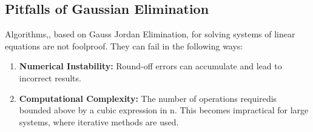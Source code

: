 \documentclass[a4paper, 10pt]{article}
\begin{document}
\subsection{Pitfalls of Gaussian Elimination}
Algorithms,, based on Gauss Jordan Elimination, for solving systems of linear equations are not foolproof. They can fail in the following ways:
\begin{enumerate}
  \item \textbf{Numerical Instability:} Round-off errors can accumulate and lead to incorrect results.
  \item \textbf{Computational Complexity:} The number of operations requiredis bounded above by a cubic expression in n. This becomes impractical for large systems, where iterative methods are used.
\end{enumerate}
\pagebreak
\end{document}
